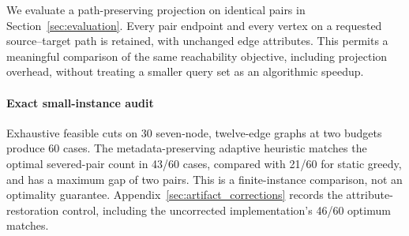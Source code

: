 We evaluate a path-preserving projection on identical pairs in Section~\ref{sec:evaluation}. Every pair endpoint and every vertex on a requested source--target path is retained, with unchanged edge attributes. This permits a meaningful comparison of the same reachability objective, including projection overhead, without treating a smaller query set as an algorithmic speedup.

\paragraph{Exact small-instance audit}
Exhaustive feasible cuts on 30 seven-node, twelve-edge graphs at two budgets produce 60 cases. The metadata-preserving adaptive heuristic matches the optimal severed-pair count in 43/60 cases, compared with 21/60 for static greedy, and has a maximum gap of two pairs. This is a finite-instance comparison, not an optimality guarantee. Appendix~\ref{sec:artifact_corrections} records the attribute-restoration control, including the uncorrected implementation's 46/60 optimum matches.
